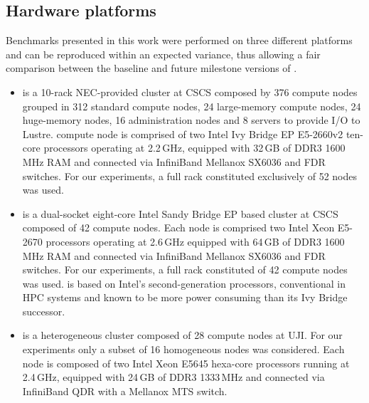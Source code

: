 \subsection{Hardware platforms}
\label{subsec:3.1}

Benchmarks presented  in this work  were performed on  three different
platforms  and can  be reproduced  within an  expected  variance, thus
allowing a  fair comparison between the baseline  and future milestone
versions of \cosmoart.

\begin{itemize}
\item \monch is  a 10-rack NEC-provided clus\-ter at  CSCS composed by
  376  compute  nodes  grouped  in  312  standard  compute  nodes,  24
  large-memory compute nodes,  24 huge-memory nodes, 16 administration
  nodes and 8 servers to provide I/O to Lustre.
  compute  node is  comprised of  two  Intel Ivy  Bridge EP  E5-2660v2
  ten-core processors  operating at 2.2\,GHz, equipped  with 32\,GB of
  DDR3 1600\,MHz RAM and  connected via InfiniBand Mellanox SX6036 and
  FDR  switches.   For  our   experiments,  a  full  rack  constituted
  exclusively of 52 nodes was used.

\item \pilat is  a dual-socket eight-core Intel Sandy  Bridge EP based
  cluster at CSCS composed of 42 compute nodes.  
  Each node  is comprised two Intel Xeon  E5-2670 processors operating
  at 2.6\,GHz equipped with 64\,GB of DDR3 1600\,MHz RAM and connected
  via  InfiniBand   Mellanox  SX6036   and  FDR  switches.    For  our
  experiments, a full  rack constituted of 42 compute  nodes was used.
  \pilat   is   based   on   Intel's   second-generation   processors,
  conventional in  HPC systems  and known to  be more  power consuming
  than its Ivy Bridge successor.

\item \tinto is  a heterogeneous cluster composed of  28 compute nodes
  at UJI.  For our experiments only  a subset of  16 homogeneous nodes
  was  considered. Each  node  is  composed of  two  Intel Xeon  E5645
  hexa-core processors  running at  2.4\,GHz, equipped with  24\,GB of
  DDR3  1333\,MHz and  connected via  InfiniBand QDR  with  a Mellanox
  MTS switch.
\end{itemize}

